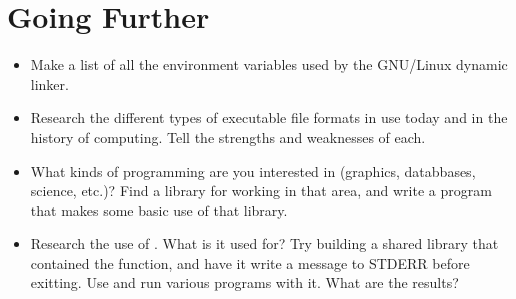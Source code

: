 \section{Going Further}

\begin{itemize}\item Make a list of all the environment variables used by the GNU/Linux dynamic linker. 
\item Research the different types of executable file formats in use today and in the history of computing.  Tell the strengths and weaknesses of each. 
\item What kinds of programming are you interested in (graphics, databbases, science, etc.)?  Find a library for working in that area, and write a program that makes some basic use of that library. 
\item Research the use of .  What is it used for?  Try building a shared library that contained the  function, and have it write a message to STDERR before exitting.  Use  and run various programs with it.  What are the results? 
\end{itemize}


